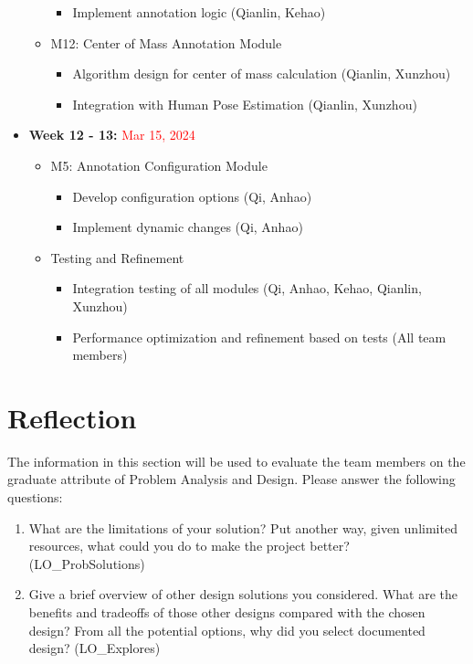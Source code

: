 \documentclass[12pt, titlepage]{article}
\newcommand{\rt}[1]{\textcolor{red}{#1}}
\begin{document}
\begin{itemize}
\begin{itemize}
\begin{itemize}
          \item Implement annotation logic (Qianlin, Kehao)
      \end{itemize}
      \item M12: Center of Mass Annotation Module
      \begin{itemize}
          \item Algorithm design for center of mass calculation (Qianlin, Xunzhou)
          \item Integration with Human Pose Estimation (Qianlin, Xunzhou)
      \end{itemize}
  \end{itemize}
  \item \textbf{Week 12 - 13:} \rt{Mar 15, 2024}
  \begin{itemize}
      \item M5: Annotation Configuration Module
      \begin{itemize}
          \item Develop configuration options (Qi, Anhao)
          \item Implement dynamic changes (Qi, Anhao)
      \end{itemize}
      \item Testing and Refinement
      \begin{itemize}
          \item Integration testing of all modules (Qi, Anhao, Kehao, Qianlin, Xunzhou)
          \item Performance optimization and refinement based on tests (All team members)
      \end{itemize}
  \end{itemize}
\end{itemize}

\section{Reflection}

The information in this section will be used to evaluate the team members on the
graduate attribute of Problem Analysis and Design.  Please answer the following questions:

\begin{enumerate}
  \item What are the limitations of your solution?  Put another way, given
  unlimited resources, what could you do to make the project better? (LO\_ProbSolutions)
  \item Give a brief overview of other design solutions you considered.  What
  are the benefits and tradeoffs of those other designs compared with the chosen
  design?  From all the potential options, why did you select documented design?
  (LO\_Explores)
\end{enumerate}
\end{document}
